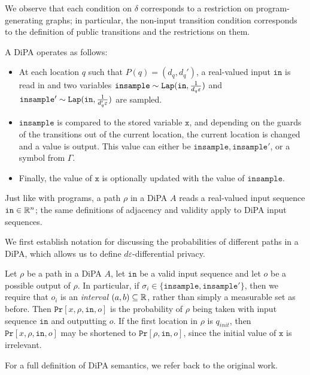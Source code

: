 We observe that each condition on $\delta$ corresponds to a restriction on program-generating graphs; in particular, the non-input transition condition corresponds to the definition of public transitions and the restrictions on them. 

A DiPA operates as follows: 
\begin{itemize}
    \item At each location $q$ such that $P(q) = (d_q, d_q')$, a real-valued input $\texttt{in}$ is read in and two variables $\texttt{insample}\sim \texttt{Lap}(\texttt{in}, \frac{1}{d_q\varepsilon})$ and $\texttt{insample}'\sim\texttt{Lap}(\texttt{in}, \frac{1}{d_q'\varepsilon})$ are sampled.
    \item $\texttt{insample}$ is compared to the stored variable $\texttt{x}$, and depending on the guards of the transitions out of the current location, the current location is changed and a value is output. This value can either be $\texttt{insample}, \texttt{insample}'$, or a symbol from $\Gamma$.
    \item Finally, the  value of $\texttt{x}$ is optionally updated with the value of $\texttt{insample}$.
\end{itemize}

Just like with programs, a path $\rho$ in a DiPA $A$ reads a real-valued input sequence $\texttt{in}\in \mathbb{R}^n$; the same definitions of adjacency and validity apply to DiPA input sequences.

We first establish notation for discussing the probabilities of different paths in a DiPA, which allows us to define $d\varepsilon$-differential privacy. 

\begin{defn} 
    Let $\rho$ be a path in a DiPA $A$, let $\texttt{in}$ be a valid input sequence and let $o$ be a possible output of $\rho$. In particular, if $\sigma_i\in \{\texttt{insample}, \texttt{insample}'\}$, then we require that $o_i$ is an \textit{interval} $(a, b)\subseteq \mathbb{R}$, rather than simply a measurable set as before. 
    Then $\texttt{Pr}[x, \rho, \texttt{in}, o]$ is the probability of $\rho$ being taken with input sequence $\texttt{in}$ and outputting $o$. If the first location in $\rho$ is $q_{init}$, then $\texttt{Pr}[x, \rho, \texttt{in}, o]$ may be shortened to $\texttt{Pr}[\rho, \texttt{in}, o]$, since the initial value of $\texttt{x}$ is irrelevant.
\end{defn}

For a full definition of DiPA semantics, we refer back to the original work. 

